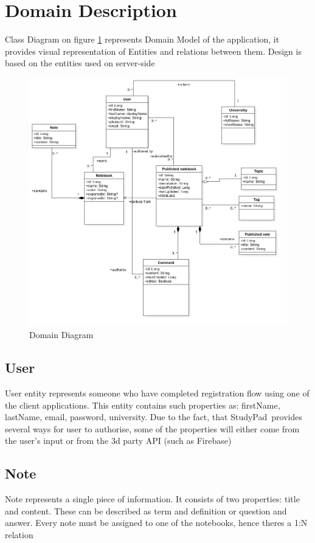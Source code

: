 \documentclass[thesis=B,english]{FITthesis}[2012/10/20]
\newcommand{\appname}{StudyPad}
\begin{document}
\newpage
\section{Domain Description}
 Class Diagram on figure \ref{fig:domain} represents Domain Model of the application, it provides visual representation of Entities and relations between them. Design is based on the entities used on server-side

\begin{figure}[H]
  \includegraphics[width=\linewidth]{Domain}
  \caption{Domain Diagram}
  \label{fig:domain}
\end{figure}

 

\subsection{User}
	User entity represents someone who have completed registration flow using one of the client applications. This entity contains such properties as: firstName, lastName, email, password, university. Due to the fact, that \appname\ provides several ways for user to authorise, some of the properties will either come from the user's input or from the 3d party API (such as Firebase)

	
\subsection{Note}
	Note represents a single piece of information. It consists of two properties: title and content. These can be described as term and definition or question and answer. Every note must be assigned to one of the notebooks, hence theres a 1:N relation
\end{document}
